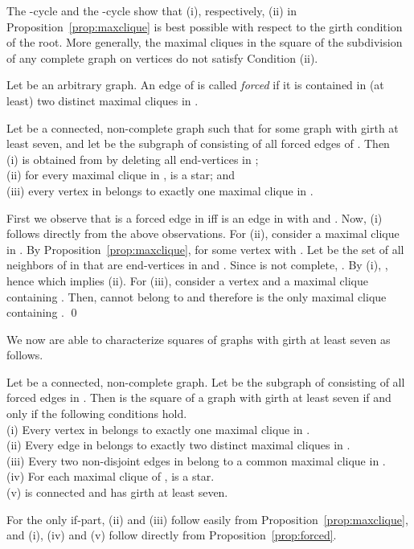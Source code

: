 \documentclass[proceedings]{stacs}
\newlength{\ai}
\begin{document}
The -cycle  and the -cycle  show that (i), respectively, (ii) in
Proposition~\ref{prop:maxclique} is best possible with respect to the girth condition of
the root. More generally, the maximal cliques in the square of the subdivision of any complete graph
on  vertices do not satisfy Condition (ii).


\begin{definition}\label{defi:forced}
Let  be an arbitrary graph. An edge of  is called \emph{forced} if it is contained in (at least)
two distinct maximal cliques in .
\end{definition}
\begin{proposition}\label{prop:forced}
Let  be a connected, non-complete graph such that  for some graph  with girth at least
seven, and let  be the subgraph of  consisting of all forced edges of . Then\\
(i)  is obtained from  by deleting all end-vertices in ;\\
(ii) for every maximal clique  in ,  is a star; and\\
(iii) every vertex in  belongs to exactly one maximal clique in .
\end{proposition}
\proof First we observe that  is a forced edge in  iff  is an edge in 
  with  and .
Now, (i) follows directly from the above observations. For (ii),
consider a maximal clique  in . By Proposition~\ref{prop:maxclique},  for
some vertex  with . Let  be the set of all neighbors of  in  that are
end-vertices in  and . Since  is not complete, . By (i),
, hence  which implies (ii).
For (iii), consider a vertex  and a maximal clique  containing .
Then,  cannot belong to  and therefore  is the only maximal clique containing . \qed

We now are able to characterize squares of graphs with girth at least seven as follows.
\begin{theorem}\label{thm:girthseven}
Let  be a connected, non-complete graph. Let  be the subgraph of  consisting of all forced
edges in . Then  is the square of a graph with girth at least seven if and only if the following
conditions hold.\\
(i)   Every vertex in  belongs to exactly one maximal clique in . \\
(ii)  Every edge in  belongs to exactly two distinct maximal cliques in .\\
(iii) Every two non-disjoint edges in  belong to a common maximal clique in .\\
(iv)  For each maximal clique  of ,  is a star.\\
(v)    is connected and has girth at least seven.
\end{theorem}
\proof For the only if-part, (ii) and (iii) follow easily from Proposition~\ref{prop:maxclique},
and (i), (iv) and (v) follow directly from Proposition~\ref{prop:forced}.
\end{document}
